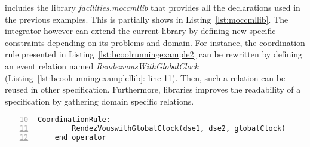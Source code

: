 \bcool includes the library \emph{facilities.moccmllib} that provides all the declarations used in the previous examples. This is partially shows in Listing~\ref{lst:moccmllib}. The integrator however can extend the current library by defining new specific constraints depending on its problems and domain. For instance, the coordination rule presented in Listing~\ref{lst:bcoolrunningexample2} can be rewritten by defining an event relation named \emph{RendezvousWithGlobalClock} (Listing~\ref{lst:bcoolrunningexamplellib}: line 11). Then, such a relation can be reused in other specification. Furthermore, libraries improves the readability of a \bcool specification by gathering domain specific relations. 
	
	\begin{lstlisting}[language=bcool,
	caption={Synchronized product operator between the TFSM and Activity languages by using the library},
	label={lst:bcoolrunningexamplellib}, 
	basicstyle=\scriptsize\ttfamily, backgroundcolor=\color{LGrey}, numbers=left, firstnumber=10, xleftmargin=2pt]
	CoordinationRule: 
		RendezVouswithGlobalClock(dse1, dse2, globalClock)
	end operator
	\end{lstlisting}
	
